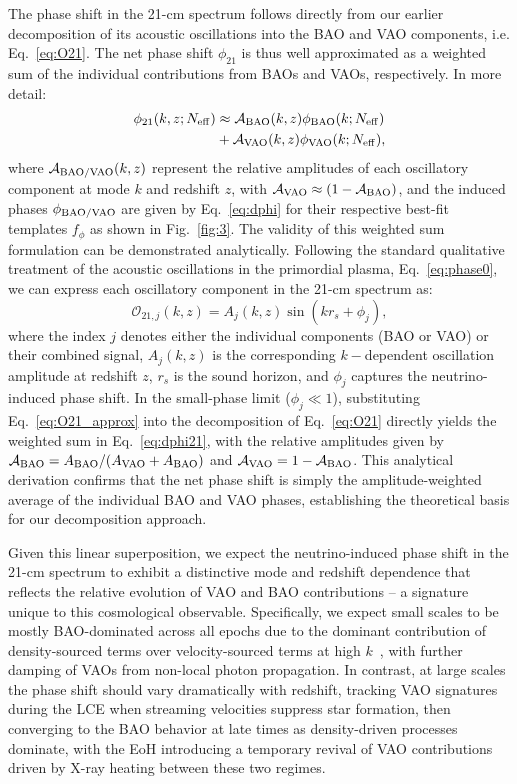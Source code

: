 \documentclass[floats,floatfix,showpacs,amssymb,prd,twocolumn,superscriptaddress,nofootinbib,reprint,preprintnumbers]{revtex4-2}
\begin{document}
\noindent The phase shift in the 21-cm spectrum follows directly from our earlier decomposition of its acoustic oscillations into the BAO and VAO components, i.e. Eq.~\eqref{eq:O21}. The net phase shift $\phi_{21}$ is thus well approximated as a weighted sum of the individual contributions from BAOs and VAOs, respectively. In more detail:
\begin{align}
    \phi_{21}(k,z;N_{\rm eff})&\approx\mathcal{A}_{\rm BAO}(k,z) \phi_{\rm BAO}(k;N_{\rm eff}) \nonumber \\
    &+ \mathcal{A}_{\rm VAO}(k,z) \phi_{\rm VAO}(k;N_{\rm eff}),\label{eq:dphi21}
\end{align}
where $\mathcal{A}_{\rm BAO/VAO}(k,z)$ represent the relative amplitudes of each oscillatory component at mode $k$ and redshift $z$, with $\mathcal{A}_{\rm VAO}\approx\left(1- \mathcal{A}_{\rm BAO}\right)$, and the induced phases $\phi_{\rm BAO/VAO}$ are given by Eq.~\eqref{eq:dphi} for their respective best-fit templates $f_\phi$ as shown in Fig.~\ref{fig:3}. The validity of this weighted sum formulation can be demonstrated analytically. Following the standard qualitative treatment of the  acoustic oscillations in the primordial plasma, Eq.~\eqref{eq:phase0}, we can express each oscillatory component in the 21-cm spectrum as:
\begin{equation}
\mathcal{O}_{21,j}(k,z) = A_j(k,z)\sin(kr_s + \phi_j), \label{eq:O21_approx}
\end{equation}
where the index $j$ denotes either the individual components (BAO or VAO) or their combined signal, $A_j(k,z)$ is the corresponding $k-$dependent oscillation amplitude at redshift $z$, $r_s$ is the sound horizon, and $\phi_j$ captures the neutrino-induced phase shift. In the small-phase limit ($\phi_j \ll 1$), substituting Eq.~\eqref{eq:O21_approx} into the decomposition of Eq.~\eqref{eq:O21} directly yields the weighted sum in Eq.~\eqref{eq:dphi21}, with the relative amplitudes given by $\mathcal{A}_{\rm BAO}=A_{\rm BAO}/(A_{\rm VAO}+A_{\rm BAO})$ and $\mathcal{A}_{\rm VAO}=1 -\mathcal{A}_{\rm BAO}$. This analytical derivation confirms that the net phase shift is simply the amplitude-weighted average of the individual BAO and VAO phases, establishing the theoretical basis for our decomposition approach.

Given this linear superposition, we expect the neutrino-induced phase shift in the 21-cm spectrum to exhibit a distinctive mode and redshift dependence that reflects the relative evolution of VAO and BAO contributions -- a signature unique to this cosmological observable. Specifically, we expect small scales to be mostly BAO-dominated across all epochs due to the dominant contribution of density-sourced terms over velocity-sourced terms at high $k$~\citep{cruz25}, with further damping of VAOs from non-local photon propagation. In contrast, at large scales the phase shift should vary dramatically with redshift, tracking VAO signatures during the LCE when streaming velocities suppress star formation, then converging to the BAO behavior at late times as density-driven processes dominate, with the EoH introducing a temporary revival of VAO contributions driven by X-ray heating between these two regimes.
\end{document}
